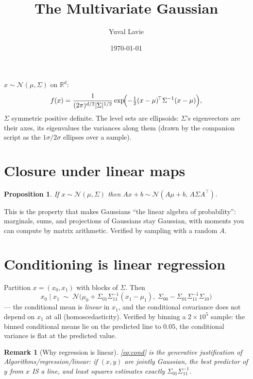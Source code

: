 \documentclass[11pt]{article}
\title{The Multivariate Gaussian}
\author{Yuval Lavie}
\date{\today}
\newtheorem{proposition}{Proposition}
\newtheorem{remark}{Remark}
\begin{document}
\maketitle

\noindent
$x \sim \mathcal{N}(\mu, \Sigma)$ on $\mathbb{R}^d$:
\begin{equation}
  f(x) = \frac{1}{(2\pi)^{d/2} |\Sigma|^{1/2}}
  \exp\!\Bigl(-\tfrac12 (x-\mu)^{\!\top} \Sigma^{-1} (x-\mu)\Bigr),
  \label{eq:density}
\end{equation}
$\Sigma$ symmetric positive definite. The level sets are ellipsoids:
$\Sigma$'s eigenvectors are their axes, its eigenvalues the variances
along them (drawn by the companion script as the $1\sigma/2\sigma$
ellipses over a sample).

\section{Closure under linear maps}

\begin{proposition}
If $x \sim \mathcal{N}(\mu, \Sigma)$ then
$Ax + b \sim \mathcal{N}(A\mu + b,\, A \Sigma A^{\!\top})$.
\end{proposition}
This is the property that makes Gaussians ``the linear algebra of
probability'': marginals, sums, and projections of Gaussians stay
Gaussian, with moments you can compute by matrix arithmetic. Verified
by sampling with a random $A$.

\section{Conditioning is linear regression}

Partition $x = (x_0, x_1)$ with blocks of $\Sigma$. Then
\begin{equation}
  \boxed{\;x_0 \mid x_1 \;\sim\; \mathcal{N}\bigl(
  \mu_0 + \Sigma_{01}\Sigma_{11}^{-1}(x_1 - \mu_1),\;
  \Sigma_{00} - \Sigma_{01}\Sigma_{11}^{-1}\Sigma_{10}\bigr)\;}
  \label{eq:cond}
\end{equation}
--- the conditional mean is \emph{linear} in $x_1$, and the
conditional covariance does not depend on $x_1$ at all
(homoscedasticity). Verified by binning a $2\times10^5$ sample: the
binned conditional means lie on the predicted line to $0.05$, the
conditional variance is flat at the predicted value.

\begin{remark}[Why regression is linear]
\eqref{eq:cond} is the generative justification of
Algorithms/regression/linear: if $(x, y)$ are jointly Gaussian, the
best predictor of $y$ from $x$ IS a line, and least squares estimates
exactly $\Sigma_{01}\Sigma_{11}^{-1}$.
\end{remark}
\end{document}
